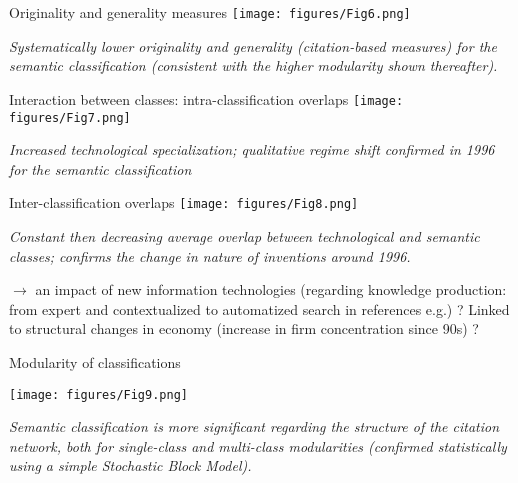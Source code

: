 \documentclass{beamer}
\begin{document}
\begin{frame}{Originality and generality measures}
    \centering
    \texttt{[image: figures/Fig6.png]}
    
    \medskip
    
    \textit{Systematically lower originality and generality (citation-based measures) for the semantic classification (consistent with the higher modularity shown thereafter).}
    
\end{frame}

\begin{frame}{Interaction between classes: intra-classification overlaps}
   \centering
    \texttt{[image: figures/Fig7.png]}
    
    \medskip

    
    \textit{Increased technological specialization; qualitative regime shift confirmed in 1996 for the semantic classification}
    
    
\end{frame}

\begin{frame}{Inter-classification overlaps}
   \centering
    \texttt{[image: figures/Fig8.png]}
    
    \medskip

    \textit{Constant then decreasing average overlap between technological and semantic classes; confirms the change in nature of inventions around 1996.} 
    
    \smallskip
    
    $\rightarrow$ an impact of new information technologies (regarding knowledge production: from expert and contextualized to automatized search in references e.g.) ? Linked to structural changes in economy (increase in firm concentration since 90s) ?
    
\end{frame}

\begin{frame}{Modularity of classifications} \label{slide:modularity}
\hyperlink{slide:modularity_def}{}

   \centering
    \texttt{[image: figures/Fig9.png]}
    
    \medskip
    
    \textit{Semantic classification is more significant regarding the structure of the citation network, both for single-class and multi-class modularities (confirmed statistically using a simple Stochastic Block Model).}
    
\end{frame}
\end{document}
